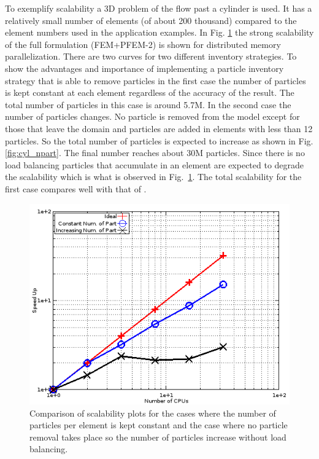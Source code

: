 To exemplify scalability a 3D problem of the flow past a cylinder is used. It has a relatively small number of elements (of about 200 thousand) compared to the element numbers used in the application examples. 
In Fig. \ref{fig:scalab} the strong scalability of the full formulation (FEM+PFEM-2) is shown for distributed memory parallelization. There are two curves for two different inventory strategies. To show the advantages and importance of implementing a particle inventory strategy that is able to remove particles in the first case the number of particles is kept constant at each element regardless of the accuracy of the result. The total number of particles in this case is around 5.7M. In the second case the number of particles changes. No particle is removed from the model except for those that leave the domain and particles are added in elements with less than 12 particles. So the total number of particles is expected to increase as shown in Fig. \ref{fig:cyl_npart}. The final number reaches about 30M particles. Since there is no load balancing particles that accumulate in an element are expected to degrade the scalability which is what is observed in Fig.~\ref{fig:scalab}. The total scalability for the first case compares well with that of \cite{gimenez:parallel}.
%
\begin{figure}[htp] 
\centering 
\includegraphics[scale=.6]{./imgs/scalability1.png}
\caption{Comparison of scalability plots for the cases where the number of particles per element is kept constant and the case where no particle removal takes place so the number of particles increase without load balancing.}
\label{fig:scalab}
\end{figure}
